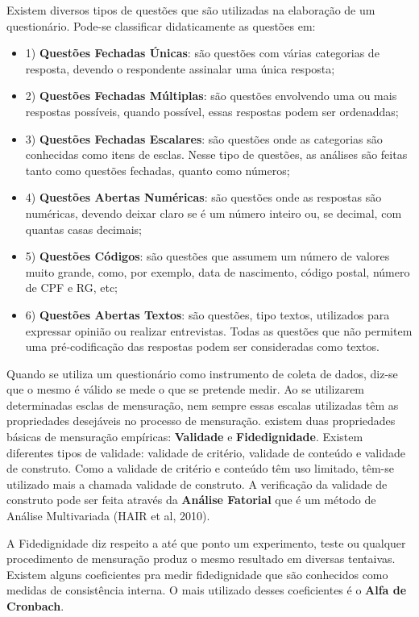 \inic Existem diversos tipos de questões que são utilizadas na elaboração de um questionário. Pode-se classificar didaticamente as questões em:

\newpage
\begin{itemize}
\item{1)} \textbf{Questões Fechadas Únicas}: são questões com várias categorias de resposta, devendo o respondente assinalar uma única resposta;
\item{2)} \textbf{Questões Fechadas Múltiplas}: são questões envolvendo uma ou mais respostas possíveis, quando possível, essas respostas podem ser ordenaddas;
\item{3)} \textbf{ Questões Fechadas Escalares}: são questões onde  as categorias são conhecidas como itens de esclas. Nesse tipo de questões, as análises são feitas tanto como questões fechadas, quanto como números;
\item{4)} \textbf{ Questões Abertas Numéricas}: são questões onde as respostas são numéricas, devendo deixar claro se é um número inteiro ou, se decimal, com quantas casas decimais;
\item{5)} \textbf{ Questões Códigos}: são questões que assumem  um número de valores muito grande, como, por exemplo, data de nascimento, código postal, número de CPF e RG, etc;
\item{6)} \textbf{ Questões Abertas Textos}: são questões, tipo textos, utilizados para expressar opinião ou realizar entrevistas. Todas as questões que não permitem uma pré-codificação das respostas podem ser consideradas como textos.
\end{itemize}

\inic Quando se utiliza um questionário como instrumento de coleta de dados, diz-se que o mesmo é válido se mede o que se pretende medir. Ao se utilizarem determinadas esclas de mensuração, nem sempre essas escalas utilizadas têm as propriedades desejáveis no processo de mensuração. existem duas propriedades básicas de mensuração empíricas: \textbf{Validade} e \textbf{Fidedignidade}. Existem diferentes tipos de validade: validade de critério, validade de conteúdo e validade de construto. Como a validade de critério e conteúdo têm uso limitado, têm-se utilizado mais a chamada validade de construto. A verificação da validade de construto pode ser feita através da \textbf{Análise Fatorial} que é um método de Análise Multivariada (HAIR et al, 2010).\vskip0.3cm

\inic A Fidedignidade diz respeito a até que ponto um experimento, teste ou qualquer procedimento de mensuração produz o mesmo resultado em diversas tentaivas. Existem alguns coeficientes pra medir fidedignidade que são conhecidos como medidas de consistência interna. O mais utilizado desses coeficientes é o \textbf{Alfa de Cronbach}.  
\vskip0.3cm



